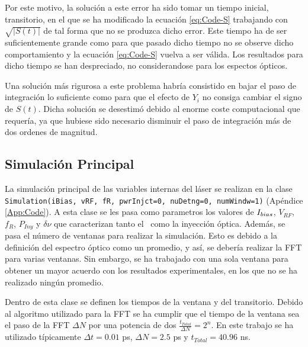 		Por este motivo, la solución a este error ha sido tomar un tiempo inicial, transitorio, en el que se ha modificado la ecuación \ref{eq:Code-S} trabajando con $\sqrt{|S(t)|}$ de tal forma que no se produzca dicho error. Este tiempo ha de ser suficientemente grande como para que pasado dicho tiempo no se observe dicho comportamiento y la ecuación \ref{eq:Code-S} vuelva a ser v\'alida. Los resultados para dicho tiempo se han despreciado, no considerandose para los espectos \'opticos.

		Una soluci\'on m\'as rigurosa a este problema habr\'ia consistido en bajar el paso de integraci\'on lo suficiente como para que el efecto de $Y_i$ no consiga cambiar el signo de $S(t)$. Dicha soluci\'on se desestim\'o debido al enorme coste computacional que requer\'ia, ya que hubiese sido necesario disminuir el paso de integraci\'on m\'as de dos ordenes de magnitud.

	\subsection{Simulaci\'on Principal}
		\label{Mdl:Code:main}
		
		La simulaci\'on principal de las variables internas del l\'aser se realizan en la clase \texttt{Simulation(iBias, vRF, fR, pwrInjct=0, nuDetng=0, numWindw=1)} (Ap\'endice \ref{App:Code}). A esta clase se les pasa como parametros los valores de $I_{bias}$, $V_{RF}$, $f_R$, $P_{Iny}$ y $\delta\nu$ que caracterizan tanto el \gs\ como la inyección \'optica. Adem\'as, se pasa el n\'umero de ventanas para realizar la simulaci\'on. Esto es debido a la definici\'on del espectro \'optico como un promedio, y as\'i, se deber\'ia realizar la FFT para varias ventanas. Sin embargo, se ha trabajado con una sola ventana para obtener un mayor acuerdo con los resultados experimentales, en los que no se ha realizado ning\'un promedio.

		Dentro de esta clase se definen los tiempos de la ventana y del transitorio. Debido al algoritmo utilizado para la FFT se ha cumplir que el tiempo de la ventana sea el paso de la FFT $\Delta N$ por una potencia de dos $\frac{t_{Total}}{\Delta N} = 2^n$. En este trabajo se ha utilizado típicamente $\Delta t = 0.01$ ps, $\Delta N = 2.5$ ps y $t_{Total} = 40.96$ ns.

